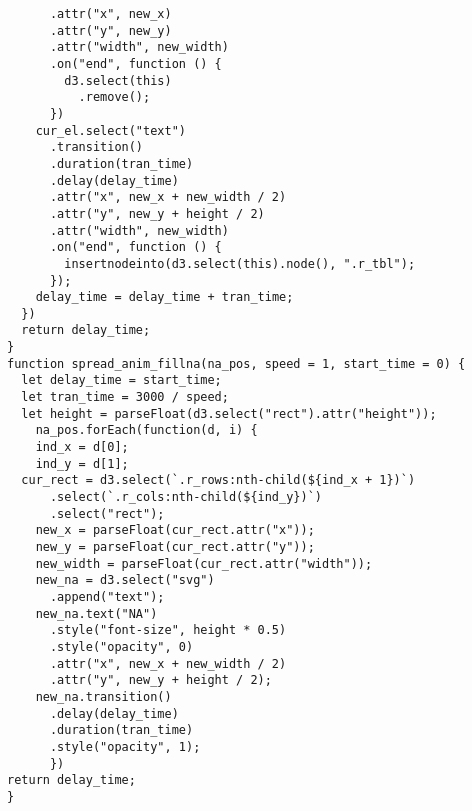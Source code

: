 \begin{lstlisting}
      .attr("x", new_x)
      .attr("y", new_y)
      .attr("width", new_width)
      .on("end", function () {
        d3.select(this)
          .remove();
      })
    cur_el.select("text")
      .transition()
      .duration(tran_time)
      .delay(delay_time)
      .attr("x", new_x + new_width / 2)
      .attr("y", new_y + height / 2)
      .attr("width", new_width)
      .on("end", function () {
        insertnodeinto(d3.select(this).node(), ".r_tbl");
      });
    delay_time = delay_time + tran_time;
  })
  return delay_time;
}
function spread_anim_fillna(na_pos, speed = 1, start_time = 0) {
  let delay_time = start_time;
  let tran_time = 3000 / speed;
  let height = parseFloat(d3.select("rect").attr("height"));
    na_pos.forEach(function(d, i) {
    ind_x = d[0];
    ind_y = d[1];
  cur_rect = d3.select(`.r_rows:nth-child(${ind_x + 1})`)
      .select(`.r_cols:nth-child(${ind_y})`)
      .select("rect");
    new_x = parseFloat(cur_rect.attr("x"));
    new_y = parseFloat(cur_rect.attr("y"));
    new_width = parseFloat(cur_rect.attr("width"));
    new_na = d3.select("svg")
      .append("text");
    new_na.text("NA")
      .style("font-size", height * 0.5)
      .style("opacity", 0)
      .attr("x", new_x + new_width / 2)
      .attr("y", new_y + height / 2);
    new_na.transition()
      .delay(delay_time)
      .duration(tran_time)
      .style("opacity", 1);
      })
return delay_time;
}
\end{lstlisting}
